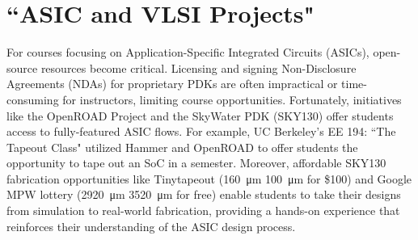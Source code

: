 \section{``ASIC and VLSI Projects"}

For courses focusing on Application-Specific Integrated Circuits (ASICs), open-source resources become critical. Licensing and signing Non-Disclosure Agreements (NDAs) for proprietary PDKs are often impractical or time-consuming for instructors, limiting course opportunities. Fortunately, initiatives like the OpenROAD Project and the SkyWater PDK (SKY130) offer students access to fully-featured ASIC flows. For example, UC Berkeley's EE 194: ``The Tapeout Class" utilized Hammer and OpenROAD to offer students the opportunity to tape out an SoC in a semester. Moreover, affordable SKY130 fabrication opportunities like Tinytapeout (\SI{160}{\micro\metre} \texttimes \SI{100}{\micro\metre} for \$100) and Google MPW lottery (\SI{2920}{\micro\metre} \texttimes \SI{3520}{\micro\metre} for free) enable students to take their designs from simulation to real-world fabrication, providing a hands-on experience that reinforces their understanding of the ASIC design process.
